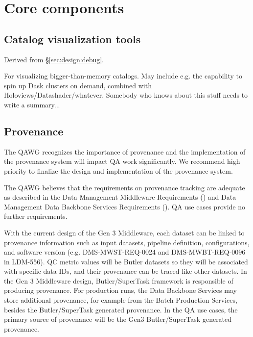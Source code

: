 \section{Core components}







\subsection{Catalog visualization tools}


Derived from \S\ref{sec:design:debug}.

For visualizing bigger-than-memory catalogs. May include e.g. the capability
to spin up Dask clusters on demand, combined with
Holoviews/Datashader/whatever. Somebody who knows about this stuff needs to
write a summary...

\subsection{Provenance}


The QAWG recognizes the importance of provenance and the
implementation of the provenance system will impact QA work
significantly.  We recommend high priority to finalize the design
and implementation of the provenance system.

The QAWG believes that the requirements on provenance tracking are
adequate as described in the Data Management Middleware Requirements
() and Data Management Data Backbone Services
Requirements (). QA use cases provide no further
requirements.

With the current design of the Gen 3 Middleware, each dataset
can be linked to provenance information such as input datasets,
pipeline definition, configurations, and software version
(e.g. DMS-MWST-REQ-0024 and DMS-MWBT-REQ-0096 in LDM-556).
QC metric values will be Butler datasets so they will be associated
with specific data IDs, and their provenance can be traced like
other datasets. In the Gen 3 Middleware design, Butler/SuperTask
framework is responsible of producing provenance.  For production
runs, the Data Backbone Services may store additional provenance,
for example from the Batch Production Services, besides the
Butler/SuperTask generated provenance.  In the QA use cases, the
primary source of provenance will be the Gen3 Butler/SuperTask
generated provenance.

